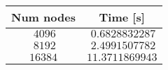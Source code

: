 \begin{center}
\begin{tabular}{cc}
\toprule
\multicolumn{1}{c}{Num nodes}&\multicolumn{1}{c}{Time [s]}\tabularnewline
\midrule
$~4096$&$~0.6828832287$\tabularnewline
$~8192$&$~2.4991507782$\tabularnewline
$16384$&$11.3711869943$\tabularnewline
\bottomrule
\end{tabular}\end{center}
